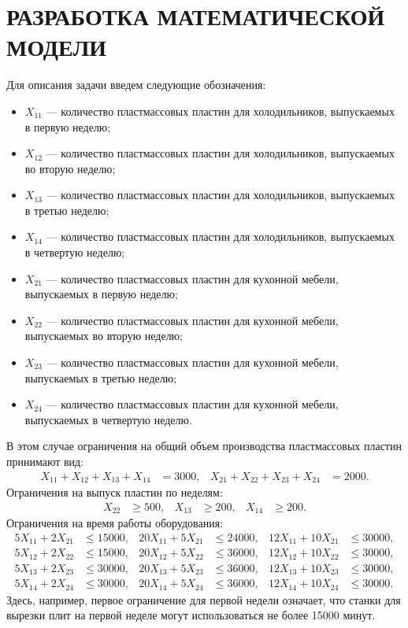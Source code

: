 \section{РАЗРАБОТКА МАТЕМАТИЧЕСКОЙ МОДЕЛИ}

Для описания задачи введем следующие обозначения:

\begin{itemize}
\item \( X_{11} \) --- количество пластмассовых пластин для холодильников,
  выпускаемых в первую неделю;
\item \( X_{12} \) --- количество пластмассовых пластин для холодильников,
  выпускаемых во вторую неделю;
\item \( X_{13} \) --- количество пластмассовых пластин для холодильников,
  выпускаемых в третью неделю;
\item \( X_{14} \) --- количество пластмассовых пластин для холодильников,
  выпускаемых в четвертую неделю;
\item \( X_{21} \) --- количество пластмассовых пластин для кухонной мебели,
  выпускаемых в первую неделю;
\item \( X_{22} \) --- количество пластмассовых пластин для кухонной мебели,
  выпускаемых во вторую неделю;
\item \( X_{23} \) --- количество пластмассовых пластин для кухонной мебели,
  выпускаемых в третью неделю;
\item \( X_{24} \) --- количество пластмассовых пластин для кухонной мебели,
  выпускаемых в четвертую неделю.
\end{itemize}

В этом случае ограничения на общий объем производства пластмассовых пластин
принимают вид:
\begin{align*}
  X_{11} + X_{12} + X_{13} + X_{14} &= 3000, 
  & X_{21} + X_{22} + X_{23} + X_{24} &= 2000.
\end{align*}
Ограничения на выпуск пластин по неделям:
\begin{align*}
  X_{22} &\ge 500, 
  & X_{13} &\ge 200, 
  & X_{14} &\ge 200.
\end{align*}
Ограничения на время работы оборудования:
\begin{align*}
  5X_{11} + 2X_{21} &\le 15000,
  & 20X_{11} + 5X_{21} &\le 24000, 
  & 12X_{11} + 10X_{21} &\le 30000, \\  
  5X_{12} + 2X_{22} &\le 15000,
  & 20X_{12} + 5X_{22} &\le 36000, 
  & 12X_{12} + 10X_{22} &\le 30000, \\
  5X_{13} + 2X_{23} &\le 30000,
  & 20X_{13} + 5X_{23} &\le 36000, 
  & 12X_{13} + 10X_{23} &\le 30000, \\
  5X_{14} + 2X_{24} &\le 30000,
  & 20X_{14} + 5X_{24} &\le 36000, 
  & 12X_{14} + 10X_{24} &\le 30000. 
\end{align*}
Здесь, например, первое ограничение для первой недели означает, что 
станки для вырезки плит на первой неделе могут использоваться не более
15000 минут.

